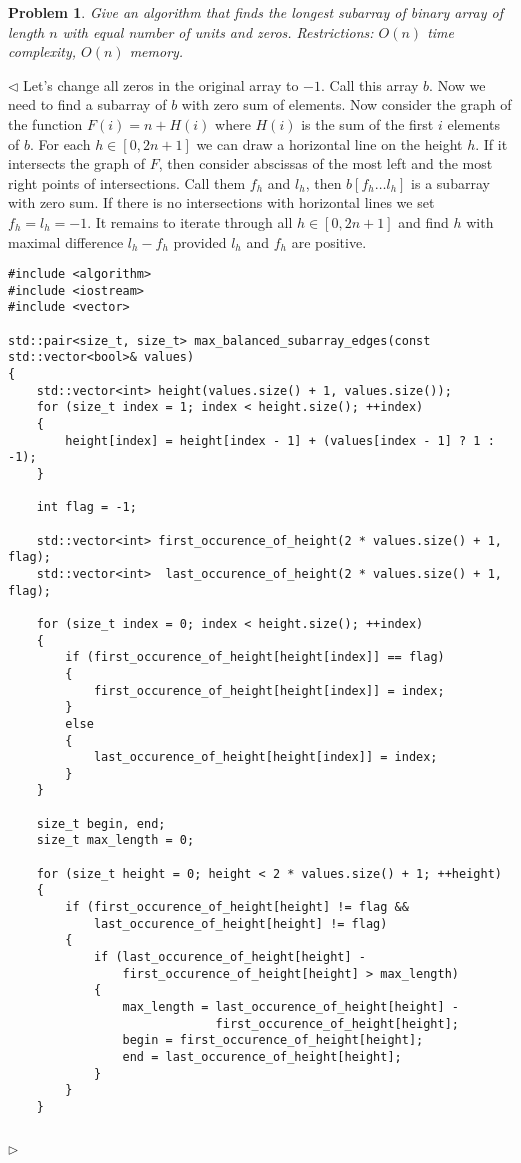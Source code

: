 \documentclass[12pt]{article}
\newtheorem{problem}{Problem}[subsection]
\newenvironment{solution}{\par $\triangleleft$}{$\triangleright$}
\begin{document}
\begin{problem} Give an algorithm that finds the longest subarray of binary array of length $n$ with equal number of units and zeros. Restrictions: $O(n)$ time complexity, $O(n)$ memory.
\end{problem}
\begin{solution} Let's change all zeros in the original array to $-1$. Call this array $b$. Now we need to find a subarray of $b$ with zero sum of elements. Now consider the graph of the function $F(i)=n+H(i)$ where $H(i)$ is the sum of the first $i$ elements of $b$. For each $h\in[0,2n+1]$ we can draw a horizontal line on the height $h$. If it intersects the graph of $F$, then consider abscissas of the most left and the most right points of intersections. Call them $f_h$ and $l_h$, then $b[f_h\ldots l_h]$ is a subarray with zero sum. If there is no intersections with horizontal lines we set $f_h=l_h=-1$. It remains to iterate through all $h\in[0,2n+1]$ and find $h$ with maximal difference $l_h - f_h$ provided $l_h$ and $f_h$ are positive.
\begin{verbatim}
#include <algorithm>
#include <iostream>
#include <vector>
 
std::pair<size_t, size_t> max_balanced_subarray_edges(const std::vector<bool>& values)
{
    std::vector<int> height(values.size() + 1, values.size());
    for (size_t index = 1; index < height.size(); ++index)
    {
        height[index] = height[index - 1] + (values[index - 1] ? 1 : -1);
    }
 
    int flag = -1;
 
    std::vector<int> first_occurence_of_height(2 * values.size() + 1, flag);
    std::vector<int>  last_occurence_of_height(2 * values.size() + 1, flag);
 
    for (size_t index = 0; index < height.size(); ++index)
    {
        if (first_occurence_of_height[height[index]] == flag)
        {
            first_occurence_of_height[height[index]] = index;
        }
        else
        {
            last_occurence_of_height[height[index]] = index;
        }
    }
 
    size_t begin, end;
    size_t max_length = 0;
 
    for (size_t height = 0; height < 2 * values.size() + 1; ++height)
    {
        if (first_occurence_of_height[height] != flag && 
            last_occurence_of_height[height] != flag)
        {
            if (last_occurence_of_height[height] - 
                first_occurence_of_height[height] > max_length)
            {
                max_length = last_occurence_of_height[height] - 
                             first_occurence_of_height[height];
                begin = first_occurence_of_height[height];
                end = last_occurence_of_height[height];
            }
        }
    }
 

\end{verbatim}
\end{solution}
\end{document}
